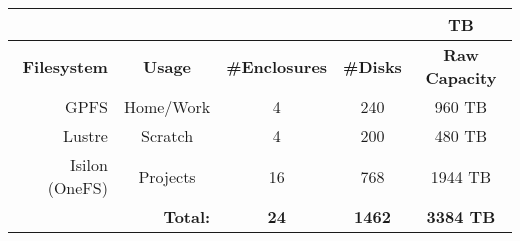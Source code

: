 % 
% 
% 


\begin{table}[h]
  \centering\scriptsize
  \begin{tabular}{|r||c|c|c|c|}
    \multicolumn{4}{c}{}  & \multicolumn{1}{c}{TB}\\\hline
    \rowcolor{lightgray}
    \textbf{Filesystem}     & \textbf{Usage}  & \textbf{\#Enclosures} & \textbf{\#Disks} & \textbf{Raw Capacity} \\ \hline \hline
    GPFS               & Home/Work       & 4                     & 240              & 960 TB                  \\
    Lustre             & Scratch         & 4                     & 200              & 480 TB                  \\
    Isilon (OneFS)     & Projects        & 16                    & 768              & 1944 TB                 \\ \hline
    \multicolumn{2}{r}{\textbf{Total:}} & \multicolumn{1}{c}{\textbf{24}} & \multicolumn{1}{c}{\textbf{1462}} & \multicolumn{1}{c}{\textbf{3384 TB}}       \\ 
  \end{tabular}
\end{table}



% 
